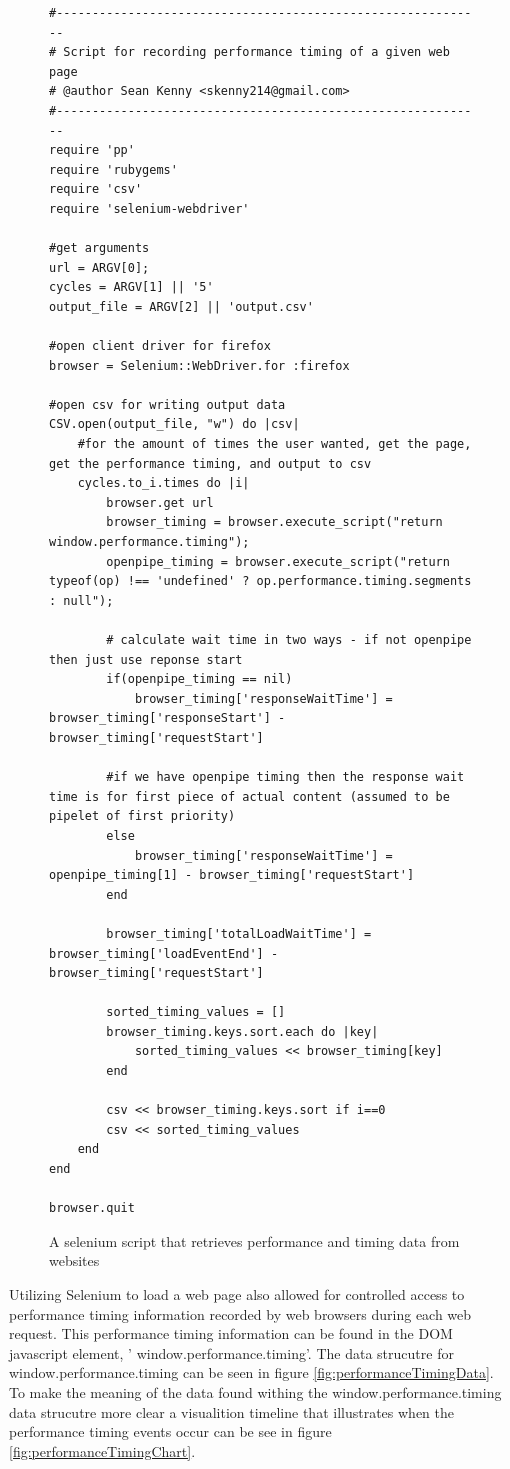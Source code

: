 \documentclass[12pt]{report}
\begin{document}
\begin{figure}[H]
\label{fig:seleniumScript}
\begin{lstlisting}
#------------------------------------------------------------
# Script for recording performance timing of a given web page
# @author Sean Kenny <skenny214@gmail.com>
#------------------------------------------------------------
require 'pp'
require 'rubygems'
require 'csv'
require 'selenium-webdriver'

#get arguments
url = ARGV[0];
cycles = ARGV[1] || '5'
output_file = ARGV[2] || 'output.csv'

#open client driver for firefox
browser = Selenium::WebDriver.for :firefox

#open csv for writing output data
CSV.open(output_file, "w") do |csv|
	#for the amount of times the user wanted, get the page, get the performance timing, and output to csv
	cycles.to_i.times do |i|	
		browser.get url
		browser_timing = browser.execute_script("return window.performance.timing"); 
		openpipe_timing = browser.execute_script("return typeof(op) !== 'undefined' ? op.performance.timing.segments : null");

		# calculate wait time in two ways - if not openpipe then just use reponse start
		if(openpipe_timing == nil)
			browser_timing['responseWaitTime'] = browser_timing['responseStart'] - browser_timing['requestStart']

		#if we have openpipe timing then the response wait time is for first piece of actual content (assumed to be pipelet of first priority)
		else		
			browser_timing['responseWaitTime'] = openpipe_timing[1] - browser_timing['requestStart']
		end

		browser_timing['totalLoadWaitTime'] = browser_timing['loadEventEnd'] - browser_timing['requestStart'] 
		
		sorted_timing_values = []
		browser_timing.keys.sort.each do |key| 
			sorted_timing_values << browser_timing[key]
		end
		
		csv << browser_timing.keys.sort if i==0
		csv << sorted_timing_values
	end
end

browser.quit
\end{lstlisting}
\caption{A selenium script that retrieves performance and timing data from websites}
\end{figure}

Utilizing Selenium to load a web page also allowed for controlled access to performance timing information recorded by web browsers during each web request. This performance timing information can be found in the DOM javascript element, ' window.performance.timing'.  The data strucutre for window.performance.timing can be seen in figure \ref{fig:performanceTimingData}. To make the meaning of the data found withing the window.performance.timing data strucutre more clear a visualition timeline that illustrates when the performance timing events occur can be see in figure \ref{fig:performanceTimingChart}.
\end{document}
